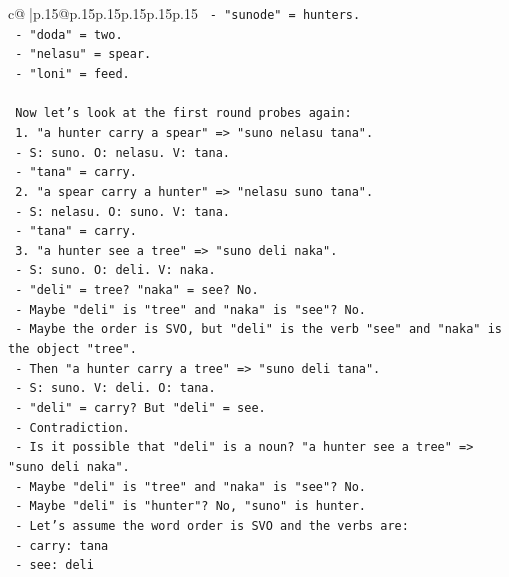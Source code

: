 \documentclass{article}
\begin{document}
{\begin{supertabular}{c@{$\;$}|p{.15\linewidth}@{}p{.15\linewidth}p{.15\linewidth}p{.15\linewidth}p{.15\linewidth}p{.15\linewidth}}
{{{\texttt{         {-} "sunode" = hunters.} \\
\texttt{         {-} "doda" = two.} \\
\texttt{         {-} "nelasu" = spear.} \\
\texttt{         {-} "loni" = feed.} \\
\\ 
\texttt{     Now let's look at the first round probes again:} \\
\texttt{     1. "a hunter carry a spear" => "suno nelasu tana".} \\
\texttt{        {-} S: suno. O: nelasu. V: tana.} \\
\texttt{        {-} "tana" = carry.} \\
\texttt{     2. "a spear carry a hunter" => "nelasu suno tana".} \\
\texttt{        {-} S: nelasu. O: suno. V: tana.} \\
\texttt{        {-} "tana" = carry.} \\
\texttt{     3. "a hunter see a tree" => "suno deli naka".} \\
\texttt{        {-} S: suno. O: deli. V: naka.} \\
\texttt{        {-} "deli" = tree? "naka" = see? No.} \\
\texttt{        {-} Maybe "deli" is "tree" and "naka" is "see"? No.} \\
\texttt{        {-} Maybe the order is SVO, but "deli" is the verb "see" and "naka" is the object "tree".} \\
\texttt{        {-} Then "a hunter carry a tree" => "suno deli tana".} \\
\texttt{          {-} S: suno. V: deli. O: tana.} \\
\texttt{          {-} "deli" = carry? But "deli" = see.} \\
\texttt{          {-} Contradiction.} \\
\texttt{     {-} Is it possible that "deli" is a noun? "a hunter see a tree" => "suno deli naka".} \\
\texttt{       {-} Maybe "deli" is "tree" and "naka" is "see"? No.} \\
\texttt{       {-} Maybe "deli" is "hunter"? No, "suno" is hunter.} \\
\texttt{     {-} Let's assume the word order is SVO and the verbs are:} \\
\texttt{       {-} carry: tana} \\
\texttt{       {-} see: deli} \\
}}}
\end{supertabular}}
\end{document}
